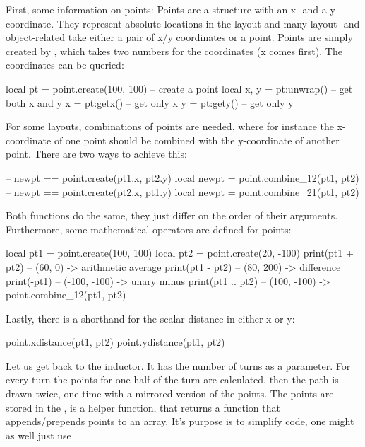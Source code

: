 First, some information on points:
Points are a structure with an x- and a y coordinate.
They represent absolute locations in the layout and many layout- and object-related take either a pair of x/y coordinates or a point.
Points are simply created by , which takes two numbers for the coordinates (x comes first).
The coordinates can be queried:
\begin{lualisting}
    local pt = point.create(100, 100) -- create a point
    local x, y = pt:unwrap() -- get both x and y
    x = pt:getx() -- get only x
    y = pt:gety() -- get only y
\end{lualisting}
For some layouts, combinations of points are needed, where for instance the x-coordinate of one point should be combined with the y-coordinate of another point.
There are two ways to achieve this:
\begin{lualisting}
    -- newpt == point.create(pt1.x, pt2.y)
    local newpt = point.combine_12(pt1, pt2)
    -- newpt == point.create(pt2.x, pt1.y)
    local newpt = point.combine_21(pt1, pt2)
\end{lualisting}
Both functions do the same, they just differ on the order of their arguments.
Furthermore, some mathematical operators are defined for points:
\begin{lualisting}
    local pt1 = point.create(100, 100)
    local pt2 = point.create(20, -100)
    print(pt1 + pt2)  -- (60, 0)      -> arithmetic average
    print(pt1 - pt2)  -- (80, 200)    -> difference
    print(-pt1)       -- (-100, -100) -> unary minus
    print(pt1 .. pt2) -- (100, -100)  -> point.combine_12(pt1, pt2)
\end{lualisting}
Lastly, there is a shorthand for the scalar distance in either x or y:
\begin{lualisting}
    point.xdistance(pt1, pt2)
    point.ydistance(pt1, pt2)
\end{lualisting}

\bigskip

Let us get back to the inductor.
It has the number of turns as a parameter.
For every turn the points for one half of the turn are calculated, then the path is drawn twice, one time with a mirrored version of the points.
The points are stored in the ,  is a helper function, that returns a function that appends/prepends points to an array. It's purpose is to simplify code, one
might as well just use .

